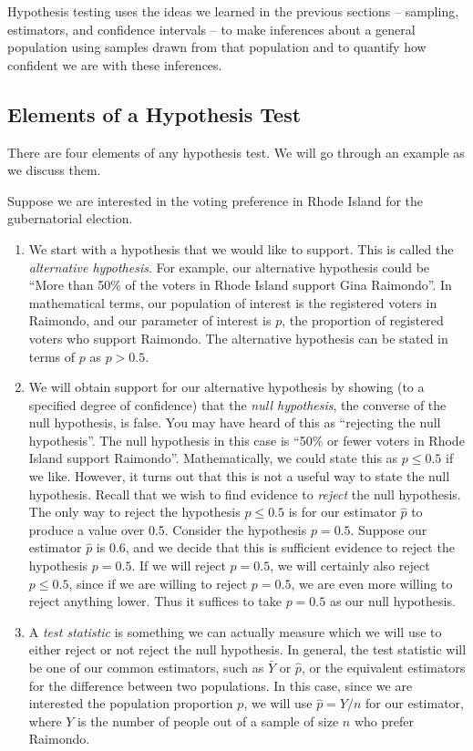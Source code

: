 \documentclass[notes.tex]{subfiles}
\begin{document}
Hypothesis testing uses the ideas we learned in the previous sections -- sampling, estimators, and confidence intervals -- to make inferences about a general population using samples drawn from that population and to quantify how confident we are with these inferences.

\subsection{Elements of a Hypothesis Test}
There are four elements of any hypothesis test. We will go through an example as we discuss them. 

\begin{example}Suppose we are interested in the voting preference in Rhode Island for the gubernatorial election. 
\begin{enumerate}
\item We start with a hypothesis that we would like to support. This is called the \emph{alternative hypothesis}. For example, our alternative hypothesis could be ``More than 50\% of the voters in Rhode Island support Gina Raimondo''. In mathematical terms, our population of interest is the registered voters in Raimondo, and our parameter of interest is $p$, the proportion of registered voters who support Raimondo. The alternative hypothesis can be stated in terms of $p$ as $p > 0.5$. 
\item We will obtain support for our alternative hypothesis by showing (to a specified degree of confidence) that the \emph{null hypothesis}, the converse of the null hypothesis, is false. You may have heard of this as ``rejecting the null hypothesis''. The null hypothesis in this case is ``50\% or fewer voters in Rhode Island support Raimondo''. Mathematically, we could state this as $p \leq 0.5$ if we like. However, it turns out that this is not a useful way to state the null hypothesis. Recall that we wish to find evidence to \emph{reject} the null hypothesis. The only way to reject the hypothesis $p \leq 0.5$ is for our estimator $\hat{p}$ to produce a value over 0.5. Consider the hypothesis $p = 0.5$. Suppose our estimator $\hat{p}$ is 0.6, and we decide that this is sufficient evidence to reject the hypothesis $p = 0.5$. If we will reject $p = 0.5$, we will certainly also reject $p \leq 0.5$, since if we are willing to reject $p = 0.5$, we are even more willing to reject anything lower. Thus it suffices to take $p = 0.5$ as our null hypothesis.
\item A \emph{test statistic} is something we can actually measure which we will use to either reject or not reject the null hypothesis. In general, the test statistic will be one of our common estimators, such as $\bar{Y}$ or $\hat{p}$, or the equivalent estimators for the difference between two populations. In this case, since we are interested the population proportion $p$, we will use $\hat{p} = Y/n$ for our estimator, where $Y$ is the number of people out of a sample of size $n$ who prefer Raimondo.

\end{enumerate}
\end{example}
\end{document}
